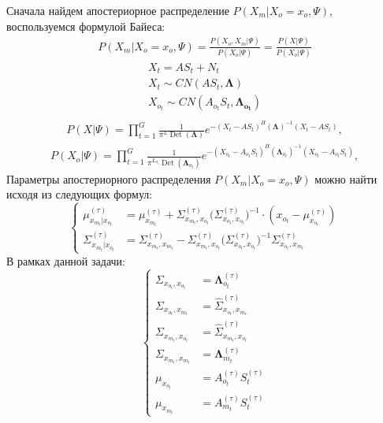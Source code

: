 \documentclass[11pt]{article}
\DeclareMathOperator{\Det}{Det}
\begin{document}
Сначала найдем апостериорное распределение $P(X_m|X_o=x_o,\Psi)$, воспользуемся формулой Байеса:
\begin{gather}
P(X_m|X_o=x_o,\Psi) = \frac{P(X_o, X_m|\Psi)}{P(X_o|\Psi)} = \frac{P(X|\Psi)}{P(X_o|\Psi)}
\end{gather}
\begin{gather*}
X_t = AS_t + N_t \\
X_t \sim CN(A S_t,\mathbf{\Lambda})\\
X_{o_t} \sim CN( A_{o_t}S_t, \mathbf{\Lambda_{o_t}})\\
\end{gather*}
\begin{gather}
P(X|\Psi) = \prod_{t=1}^G \frac{1}{\pi^L \Det(\mathbf{\Lambda})}e^{-(X_t-AS_t)^H (\mathbf{\Lambda})^{-1}(X_t-AS_t)},
\end{gather}
\begin{gather}
P(X_o|\Psi) = \prod_{t=1}^G \frac{1}{\pi^{L_{o_t}} \Det(\mathbf{\Lambda}_{o_t})}e^{-(X_{o_t}-A_{o_t}S_t)^H (\mathbf{\Lambda}_{o_t})^{-1}(X_{o_t}-A_{o_t}S_t)},
\end{gather}
Параметры апостериорного распределения $P(X_m|X_o=x_o,\Psi)$ можно найти исходя из следующих формул:
\begin{equation}
\left\{ \begin{aligned}
\mu_{x_{m_t}|x_{o_t}}^{(\tau)} &= \mu_{x_{m_t}}^{(\tau)} + \Sigma_{x_{m_t},x_{o_t}}^{(\tau)}\Big(\Sigma_{x_{o_t},x_{o_t}}^{(\tau)}\Big)^{-1}\cdot(x_{o_t}-\mu_{x_{o_t}}^{(\tau)}) \\
\Sigma_{x_{m_t}|x_{o_t}}^{(\tau)} &= \Sigma_{x_{m_t},x_{m_t}}^{(\tau)}-\Sigma_{x_{m_t},x_{o_t}}^{(\tau)}\Big(\Sigma_{x_{o_t},x_{o_t}}^{(\tau)}\Big)^{-1}\Sigma_{x_{o_t},x_{m_t}}^{(\tau)}
\end{aligned} \right.
\end{equation}
В рамках данной задачи:
\begin{equation}
\left\{ \begin{aligned} 
\Sigma_{x_{o_t},x_{o_t}} &= \mathbf{\Lambda}_{o_t}^{(\tau)} \\
\Sigma_{x_{o_t},x_{m_t}} &= \hat{\Sigma}_{x_{o_t},x_{m_t}}^{(\tau)} \\
\Sigma_{x_{m_t},x_{o_t}} &= \hat{\Sigma}_{x_{m_t},x_{o_t}}^{(\tau)} \\
\Sigma_{x_{m_t},x_{m_t}} &= \mathbf{\Lambda}_{m_t}^{(\tau)} \\
\mu_{x_{o_t}} &= A_{o_t}^{(\tau)}S_t^{(\tau)} \\
\mu_{x_{m_t}} &= A_{m_t}^{(\tau)}S_t^{(\tau)}
\end{aligned} \right.
\end{equation}
\end{document}
